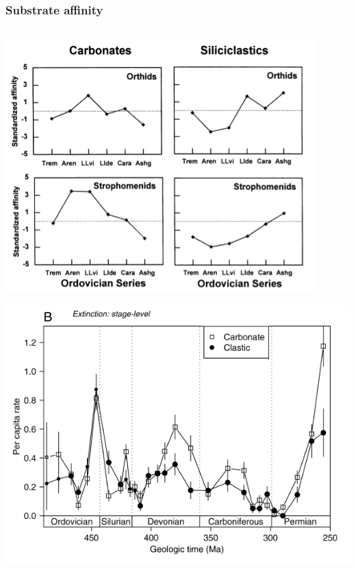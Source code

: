 \documentclass{beamer}
\begin{document}
\begin{frame}
  \frametitle{Substrate affinity}

  \begin{columns}
    \begin{column}{0.5\textwidth}
      \begin{center}
        \includegraphics[height = 0.4\textheight, keepaspectratio = true]{figure/miller}

        \tiny{}

        \includegraphics[height = 0.4\textheight, keepaspectratio = true]{figure/foote}


\end{center}
\end{column}
\end{columns}
\end{frame}
\end{document}
